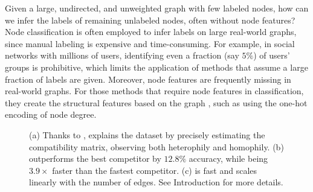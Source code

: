 


Given a large, undirected, and unweighted graph with few labeled nodes, how can we infer the labels of remaining unlabeled nodes, often without node features? 
Node classification is often employed to infer labels on large real-world graphs, since manual labeling is expensive and time-consuming.
For example, in social networks with millions of users, identifying even a fraction (say $5\%$) of users' groups is prohibitive, which limits the application of 
methods that assume a large fraction of labels are given. 
Moreover, node features are frequently missing in real-world graphs.
For those methods that require node features in classification, they create the structural features based on the graph \cite{Fey/Lenssen/2019, hamilton2017inductive, hamilton2017representation}, such as using the one-hot encoding of node degree.


\begin{figure*}[]
\centering
\captionsetup[subfloat]{captionskip=-1pt}
{}
{}
\vspace{-2mm}
\caption{\label{fig:crown} \underline{\smash{\method is \effect, \explain \xspace, and \scale.}} (a) Thanks to \NEF, \method explains the dataset by precisely estimating the compatibility matrix, observing both heterophily and homophily. 
(b) \method outperforms the best competitor by $12.8\%$ accuracy, while being $3.9\times$ faster than the fastest competitor.
(c) \method is fast and scales linearly with the number of edges. 
See Introduction for more details.
}
\end{figure*}

